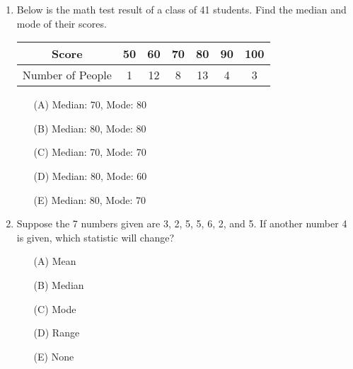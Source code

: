 \documentclass[11pt]{scrartcl}
\begin{document}
\begin{enumerate}
\item Below is the math test result of a class of 41 students. Find the median and mode of their scores.\\
\begin{tabular}{c|cccccc}
\hline
Score & 50 & 60 & 70 & 80 & 90 & 100\\
\hline
Number of People & 1 & 12 & 8 & 13 & 4 & 3\\
\hline
\end{tabular}
\begin{enumerate}
\item[(A)] Median: 70, Mode: 80
\item[(B)] Median: 80, Mode: 80
\item[(C)] Median: 70, Mode: 70
\item[(D)] Median: 80, Mode: 60
\item[(E)] Median: 80, Mode: 70
\end{enumerate}
\vspace{4\baselineskip}

\item Suppose the 7 numbers given are 3, 2, 5, 5, 6, 2, and 5. If another number 4 is given, which statistic will change?
\begin{enumerate}
\item[(A)] Mean
\item[(B)] Median
\item[(C)] Mode
\item[(D)] Range
\item[(E)] None
\end{enumerate}

\end{enumerate}
\end{document}
